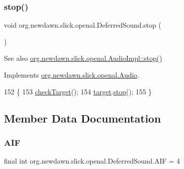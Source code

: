 \subsubsection{\texorpdfstring{stop()}{stop()}}
{\footnotesize\ttfamily void org.\+newdawn.\+slick.\+openal.\+Deferred\+Sound.\+stop (\begin{DoxyParamCaption}{ }\end{DoxyParamCaption})\hspace{0.3cm}{\ttfamily [inline]}}

\begin{DoxySeeAlso}{See also}
\mbox{\hyperlink{classorg_1_1newdawn_1_1slick_1_1openal_1_1_audio_impl_a8ad896e19c35a9d3d1d93e52685158ff}{org.\+newdawn.\+slick.\+openal.\+Audio\+Impl\+::stop()}} 
\end{DoxySeeAlso}


Implements \mbox{\hyperlink{interfaceorg_1_1newdawn_1_1slick_1_1openal_1_1_audio_a8346ca83b84cb6605efb695462f12337}{org.\+newdawn.\+slick.\+openal.\+Audio}}.


\begin{DoxyCode}
152                        \{
153         \mbox{\hyperlink{classorg_1_1newdawn_1_1slick_1_1openal_1_1_deferred_sound_a63fc1a65a177fcaeb93ba0a071c10086}{checkTarget}}();
154         \mbox{\hyperlink{classorg_1_1newdawn_1_1slick_1_1openal_1_1_deferred_sound_ab156655c2d91c0a6bbec8bd4438ac875}{target}}.\mbox{\hyperlink{interfaceorg_1_1newdawn_1_1slick_1_1openal_1_1_audio_a8346ca83b84cb6605efb695462f12337}{stop}}();
155     \}
\end{DoxyCode}


\subsection{Member Data Documentation}
\mbox{\label{classorg_1_1newdawn_1_1slick_1_1openal_1_1_deferred_sound_abf62a0f4062961ae7a52af61455ba0ed}} 
\subsubsection{\texorpdfstring{A\+IF}{AIF}}
{\footnotesize\ttfamily final int org.\+newdawn.\+slick.\+openal.\+Deferred\+Sound.\+A\+IF = 4\hspace{0.3cm}{\ttfamily [static]}}

